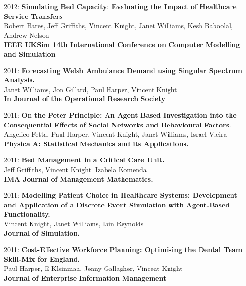 \documentclass[10pt]{res} %
\begin{document}
\begin{resume}
\begin{etaremune}
\item
2012: \textbf{Simulating Bed Capacity: Evaluating the Impact of Healthcare Service Transfers}\\
Robert Bares, Jeff Griffiths, Vincent Knight, Janet Williams, Kesh Baboolal, Andrew Nelson
\\
\textbf{IEEE UKSim 14th International Conference on Computer Modelling and Simulation}
\\

\item
2011: \textbf{Forecasting Welsh Ambulance Demand using Singular Spectrum Analysis.}\\
Janet Williams, Jon Gillard, Paul Harper, Vincent Knight
\\
\textbf{In Journal of the Operational Research Society}
\\

\item
2011: \textbf{On the Peter Principle: An Agent Based Investigation into the Consequential Effects of Social Networks and Behavioural Factors.}\\
Angelico Fetta, Paul Harper, Vincent Knight, Janet Williams, Israel Vieira
\\
\textbf{Physica A: Statistical Mechanics and its Applications.}
\\

\item
2011: \textbf{Bed Management in a Critical Care Unit.}\\
Jeff Griffiths, Vincent Knight, Izabela Komenda
\\
\textbf{IMA Journal of Management Mathematics.}
\\

\item
2011: \textbf{Modelling Patient Choice in Healthcare Systems: Development and Application of a Discrete Event Simulation with Agent-Based Functionality.}\\
Vincent Knight, Janet Williams, Iain Reynolds
\\
\textbf{Journal of Simulation.}
\\

\item
2011: \textbf{Cost-Effective Workforce Planning: Optimising the Dental Team Skill-Mix for England.}\\
Paul Harper, E Kleinman, Jenny Gallagher, Vincent Knight
\\
\textbf{Journal of Enterprise Information Management}
\\


\end{etaremune}
\end{resume}
\end{document}
